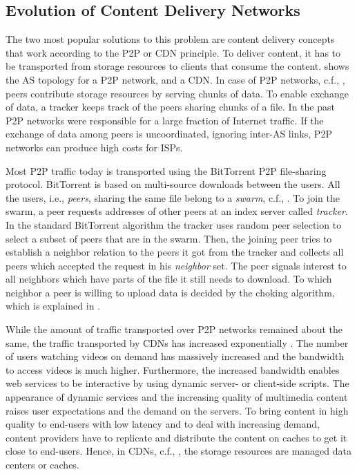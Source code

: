\subsection{Evolution of Content Delivery Networks}

The two most popular solutions to this problem are content delivery concepts that work according to the P2P or CDN principle.
To deliver content, it has to be transported from storage resources to clients that consume the content.
 shows the AS topology for a P2P network, and a CDN.
In case of P2P networks, c.f., , peers contribute storage resources by serving chunks of data.
To enable exchange of data, a tracker keeps track of the peers sharing chunks of a file.
In the past P2P networks were responsible for a large fraction of Internet traffic.
If the exchange of data among peers is uncoordinated, ignoring inter-AS links, P2P networks can produce high costs for ISPs.

Most P2P traffic today is transported using the BitTorrent P2P file-sharing protocol.
BitTorrent is based on multi-source downloads between the users. All the users, i.e., \textit{peers}, sharing the same file belong to a \textit{swarm}, c.f., . To join the swarm, a peer requests addresses of other peers at an index server called \textit{tracker}. In the standard BitTorrent algorithm the tracker uses random peer selection to select a subset of peers that are in the swarm. Then, the joining peer tries to establish a neighbor relation to the peers it got from the tracker and collects all peers which accepted the request in his \textit{neighbor} set. The peer signals interest to all neighbors which have parts of the file it still needs to download. To which neighbor a peer is willing to upload data is decided by the choking algorithm, which is explained in \cite{cohen:bt}.

While the amount of traffic transported over P2P networks remained about the same, the traffic transported by CDNs has increased exponentially \cite{cisco2016}.
The number of users watching videos on demand has massively increased and the bandwidth to access videos is much higher.
Furthermore, the increased bandwidth enables web services to be interactive by using dynamic server- or client-side scripts.
The appearance of dynamic services and the increasing quality of multimedia content raises user expectations and the demand on the servers.
To bring content in high quality to end-users with low latency and to deal with increasing demand, content providers have to replicate and distribute the content on caches to get it close to end-users.
Hence, in CDNs, c.f., , the storage resources are managed data centers or caches.

